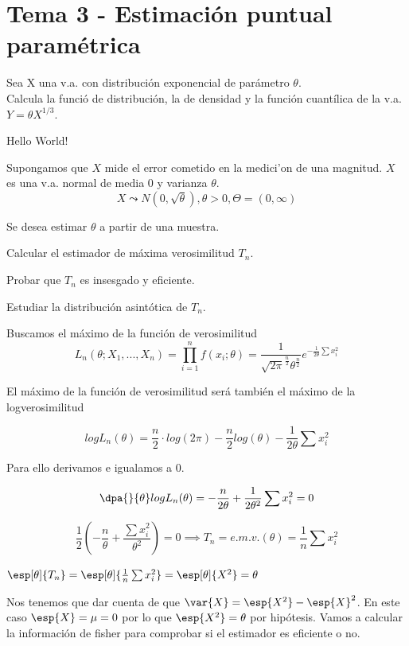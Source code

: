 \newpage
\section{Tema 3 - Estimación puntual paramétrica}

\begin{problem}[1]
Sea X una v.a. con distribución exponencial de parámetro $\theta$.\\
Calcula la funció de distribución, la de densidad y la función cuantílica de la v.a. $Y = \theta X^{1/3}$.
\solution

Hello World!

\end{problem}

\begin{problem}[2]
Supongamos que $X$ mide el error cometido en la medici'on de una magnitud. $X$ es una v.a. normal de media 0 y varianza $\theta$. 	
\[X\leadsto N(0,\sqrt{\theta}), \theta>0, \Theta = (0,\infty)\]

Se desea estimar $\theta$ a partir de una muestra.

\ppart Calcular el estimador de máxima verosimilitud $T_n$.

\ppart Probar que $T_n$ es insesgado y eficiente.

\ppart Estudiar la distribución asintótica de $T_n$.

\solution
\spart Buscamos el máximo de la función de verosimilitud
\[L_n(\theta;X_1,...,X_n) = \prod_{i=1}^n f(x_i;\theta) = \frac{1}{\sqrt{2\pi}^{\frac{n}{2}}\theta^{\frac{n}{2}}} e ^ {-\frac{1}{2\theta} \sum x_i^2}\]

El máximo de la función de verosimilitud será también el máximo de la logverosimilitud

\[logL_n(\theta) = \frac{n}{2}\cdot log(2\pi) - \frac{n}{2}log(\theta) - \frac{1}{2\theta} \sum x_i^2\]

Para ello derivamos e igualamos a 0.

\[\dpa{}{\theta} logL_n(\theta) = -\frac{n}{2\theta} + \frac{1}{2\theta^2}\sum x_i^2  = 0\]

\[\frac{1}{2}\left( - \frac{n}{\theta} + \frac{\sum x_i^2}{\theta^2}\right) = 0 \implies T_n = e.m.v.(\theta) = \frac{1}{n}\sum x_i^2\]


\spart $\esp[\theta]{T_n} = \esp[\theta]{\frac{1}{n}\sum x_i^2} = \esp[\theta]{X^2} = \theta$

Nos tenemos que dar cuenta de que $\var{X} = \esp{X^2} - \esp{X}^2$. En este caso $\esp{X} = \mu = 0$ por lo que $\esp{X^2} = \theta$ por hipótesis.
Vamos a calcular la información de fisher para comprobar si el estimador es eficiente o no.


\end{problem}
